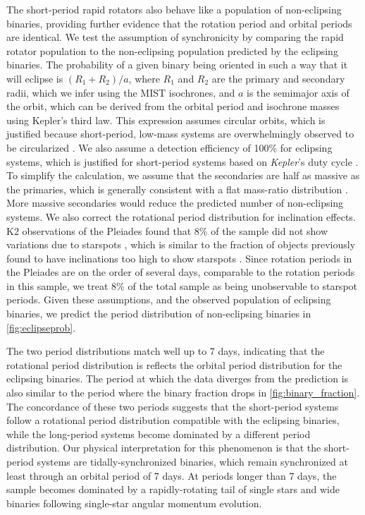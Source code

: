 \documentclass[manuscript]{aastex6}
\newcommand{\Kepler}{\mbox{\textit{Kepler}}}
\begin{document}
The short-period rapid rotators also behave like a population of non-eclipsing
binaries, providing further evidence that the rotation period and orbital
periods are identical. We test the assumption of synchronicity by comparing the
rapid rotator population to the non-eclipsing population predicted by the
eclipsing binaries. The probability of a given binary being oriented in such a
way that it will eclipse is \((R_1 + R_2)/a\), where \(R_1\) and \(R_2\) are
the primary and secondary radii, which we infer using the MIST isochrones, 
and \(a\) is the semimajor axis of the orbit, which can be derived from the
orbital period and isochrone masses using Kepler's third law.
This expression assumes circular orbits, which is justified because
short-period, low-mass systems are overwhelmingly observed to be circularized
\citep{Raghavan10,VanEylen16}. We also assume a detection efficiency of 100\%
for eclipsing systems, which is justified for short-period systems based on 
\Kepler{}'s duty cycle \citep{Kirk16}. To simplify the calculation, we
assume that the secondaries are half as massive as the primaries, which is
generally consistent with a flat mass-ratio distribution \citep{Raghavan10}. 
More massive secondaries would reduce the predicted number of non-eclipsing 
systems. We also correct the rotational period distribution for inclination
effects. K2 observations of the Pleiades found that 8\% of the sample did not
show variations due to starspots \citep{Rebull17}, which is similar to the
fraction of objects previously found to have inclinations too high to show
starspots \citep{Jackson10}. Since rotation periods in the Pleiades are on the
order of several days, comparable to the rotation periods in this sample, we
treat 8\% of the total sample as being unobservable to starspot periods. Given 
these assumptions, and the observed population of eclipsing binaries, we predict 
the period distribution of non-eclipsing binaries in \cref{fig:eclipseprob}. 

The two period distributions match well up to 7 days, indicating
that the rotational period distribution is reflects the orbital period
distribution for the eclipsing binaries. The period at which the data diverges
from the prediction is also similar to the period where the binary fraction 
drops in \cref{fig:binary_fraction}. The concordance of these two periods 
suggests that the short-period systems follow a 
rotational period distribution compatible with the eclipsing binaries, while 
the long-period systems become dominated by a different 
period distribution. Our physical interpretation for this phenomenon is that the
short-period systems are tidally-synchronized binaries, which remain 
synchronized at least through an orbital period of 7 days. At periods longer
than 7 days, the sample becomes dominated by a rapidly-rotating tail of single
stars and wide binaries following single-star angular momentum evolution.
\end{document}
